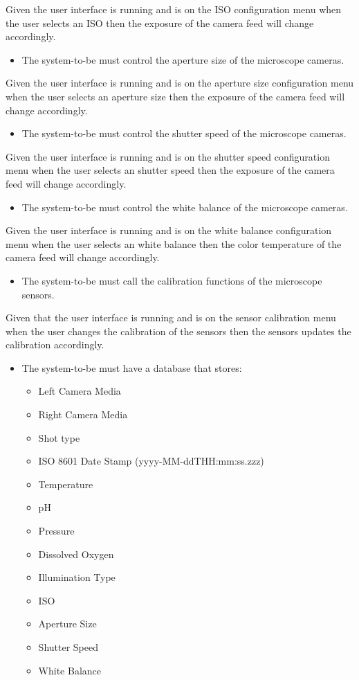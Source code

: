 Given the user interface is running and is on the ISO configuration menu when the user selects an ISO then the exposure of the camera feed will change accordingly.
\begin{itemize}
	\item The system-to-be must control the aperture size of the microscope cameras.
\end{itemize}
Given the user interface is running and is on the aperture size configuration menu when the user selects an aperture size then the exposure of the camera feed will change accordingly.
\begin{itemize}
	\item The system-to-be must control the shutter speed of the microscope cameras.
\end{itemize}
Given the user interface is running and is on the shutter speed configuration menu when the user selects an shutter speed then the exposure of the camera feed will change accordingly.
\begin{itemize}
	\item The system-to-be must control the white balance of the microscope cameras.
\end{itemize}
Given the user interface is running and is on the white balance configuration menu when the user selects an white balance then the color temperature of the camera feed will change accordingly.
\begin{itemize}
	\item The system-to-be must call the calibration functions of the microscope sensors.
\end{itemize}
Given that the user interface is running and is on the sensor calibration menu when the user changes the calibration of the sensors then the sensors updates the calibration accordingly.
\begin{itemize}
	\item The system-to-be must have a database that stores:
	      \begin{itemize}
		      \item Left Camera Media
		      \item Right Camera Media
		      \item Shot type
		      \item ISO 8601 Date Stamp (yyyy-MM-ddTHH:mm:ss.zzz)
		      \item Temperature
		      \item pH
		      \item Pressure
		      \item Dissolved Oxygen
		      \item Illumination Type
		      \item ISO
		      \item Aperture Size
		      \item Shutter Speed
		      \item White Balance
	      \end{itemize}
\end{itemize}
